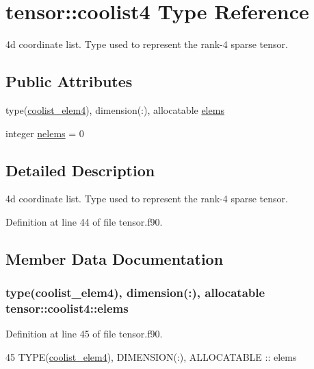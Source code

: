 \hypertarget{structtensor_1_1coolist4}{}\section{tensor\+:\+:coolist4 Type Reference}
\label{structtensor_1_1coolist4}


4d coordinate list. Type used to represent the rank-\/4 sparse tensor.  


\subsection*{Public Attributes}
\begin{DoxyCompactItemize}
\item 
type(\hyperlink{structtensor_1_1coolist__elem4}{coolist\+\_\+elem4}), dimension(\+:), allocatable \hyperlink{structtensor_1_1coolist4_ae0dac8eb9d1c7d2e2b3ecc522db53db4}{elems}
\item 
integer \hyperlink{structtensor_1_1coolist4_aa3ea70f21c208f3a4ec1b81234e41db1}{nelems} = 0
\end{DoxyCompactItemize}


\subsection{Detailed Description}
4d coordinate list. Type used to represent the rank-\/4 sparse tensor. 

Definition at line 44 of file tensor.\+f90.



\subsection{Member Data Documentation}
\subsubsection[{\texorpdfstring{elems}{elems}}]{\setlength{\rightskip}{0pt plus 5cm}type({\bf coolist\+\_\+elem4}), dimension(\+:), allocatable tensor\+::coolist4\+::elems}\hypertarget{structtensor_1_1coolist4_ae0dac8eb9d1c7d2e2b3ecc522db53db4}{}\label{structtensor_1_1coolist4_ae0dac8eb9d1c7d2e2b3ecc522db53db4}


Definition at line 45 of file tensor.\+f90.


\begin{DoxyCode}
45      \textcolor{keywordtype}{TYPE}(\hyperlink{structtensor_1_1coolist__elem4}{coolist\_elem4}), \textcolor{keywordtype}{DIMENSION(:)}, \textcolor{keywordtype}{ALLOCATABLE} :: elems
\end{DoxyCode}
